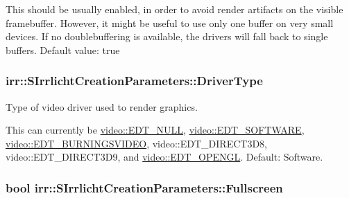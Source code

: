 This should be usually enabled, in order to avoid render artifacts on the visible framebuffer. However, it might be useful to use only one buffer on very small devices. If no doublebuffering is available, the drivers will fall back to single buffers. Default value\+: true 
\subsubsection[{\texorpdfstring{Driver\+Type}{DriverType}}]{ irr\+::\+S\+Irrlicht\+Creation\+Parameters\+::\+Driver\+Type}\hypertarget{structirr_1_1SIrrlichtCreationParameters_a1ea2f50c3b3a8eed6602a1a86e1cdf82}{}\label{structirr_1_1SIrrlichtCreationParameters_a1ea2f50c3b3a8eed6602a1a86e1cdf82}


Type of video driver used to render graphics. 

This can currently be \hyperlink{namespaceirr_1_1video_ae35a6de6d436c76107ad157fe42356d0acfdbd476cbfd4d05e72f9adffcc42210}{video\+::\+E\+D\+T\+\_\+\+N\+U\+LL}, \hyperlink{namespaceirr_1_1video_ae35a6de6d436c76107ad157fe42356d0a1598cd235a1a6bd052e2011b559e8995}{video\+::\+E\+D\+T\+\_\+\+S\+O\+F\+T\+W\+A\+RE}, \hyperlink{namespaceirr_1_1video_ae35a6de6d436c76107ad157fe42356d0ae85481da26159b967191ccc6de1e4a05}{video\+::\+E\+D\+T\+\_\+\+B\+U\+R\+N\+I\+N\+G\+S\+V\+I\+D\+EO}, video\+::\+E\+D\+T\+\_\+\+D\+I\+R\+E\+C\+T3\+D8, video\+::\+E\+D\+T\+\_\+\+D\+I\+R\+E\+C\+T3\+D9, and \hyperlink{namespaceirr_1_1video_ae35a6de6d436c76107ad157fe42356d0a2715182a79f1cb8e2826fd68a8150a53}{video\+::\+E\+D\+T\+\_\+\+O\+P\+E\+N\+GL}. Default\+: Software. 
\subsubsection[{\texorpdfstring{Fullscreen}{Fullscreen}}]{\setlength{\rightskip}{0pt plus 5cm}bool irr\+::\+S\+Irrlicht\+Creation\+Parameters\+::\+Fullscreen}\hypertarget{structirr_1_1SIrrlichtCreationParameters_a40c03ef099d60cec514697baf0b64214}{}\label{structirr_1_1SIrrlichtCreationParameters_a40c03ef099d60cec514697baf0b64214}


